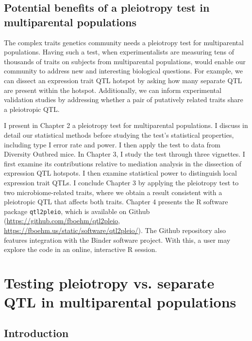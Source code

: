 \documentclass[oneside]{book}\usepackage[]{graphicx}\usepackage[]{color}
\begin{document}
\section{Potential benefits of a pleiotropy test in multiparental populations}\label{sec:pleiotropy-mpp}

The complex traits genetics community needs a pleiotropy test for
multiparental populations. Having such a test, when experimentalists are
measuring tens of thousands of traits on subjects from multiparental populations,
would enable our community to address new and interesting biological questions.
For example, we can dissect an expression trait QTL hotspot by asking how many
separate QTL are present within the hotspot. Additionally, we can inform experimental
validation studies by addressing whether a pair of putatively related traits share a
pleiotropic QTL.

I present in Chapter 2 a pleiotropy test for multiparental populations. I discuss in 
detail our statistical methods before studying the test's statistical properties,
including type I error rate and power. I then apply the test to data from Diversity
Outbred mice. In Chapter 3, I study the test through three vignettes. I first examine
its contributions relative to mediation analysis in the dissection of expression QTL
hotspots. I then examine statistical power to distinguish local expression trait QTLs.
I conclude Chapter 3 by applying the pleiotropy test to two microbiome-related traits,
where we obtain a result consistent with a pleiotropic QTL that affects both traits.
Chapter 4 presents the R software package \texttt{qtl2pleio}, which is
available on Github (\url{https://github.com/fboehm/qtl2pleio}, 
\url{https://fboehm.us/static/software/qtl2pleio/}). The Github repository also
features integration with the Binder software project. With this, a user may explore the
code in an online, interactive R session. 











\chapter{Testing pleiotropy vs. separate QTL in multiparental populations}\label{sec:testing}


\section{Introduction}
\end{document}
